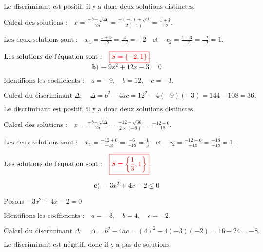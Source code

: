 \documentclass[12pt,a4paper]{article}
\begin{document}
\(
\text{Le discriminant est positif, il y a donc deux solutions distinctes.}
\)

\(
\text{Calcul des solutions :} \quad
x = \frac{-b \pm \sqrt{\Delta}}{2a} = \frac{-(-1) \pm \sqrt{9}}{2(-1)} = \frac{1 \pm 3}{-2}.
\)

\(
\text{Les deux solutions sont :} \quad
x_1 = \frac{1 + 3}{-2} = \frac{4}{-2} = -2 \quad \text{et} \quad x_2 = \frac{1 - 3}{-2} = \frac{-2}{-2} = 1.
\)

\(
\text{Les solutions de l'équation sont :} \quad
\textcolor{red}{\boxed{S=\left\lbrace  -2 , 1\right\rbrace  }}.
\)
\\
\[ \textbf{b)} \, -9x^2 + 12x - 3 = 0 \]

\(
\text{Identifions les coefficients :} \quad a = -9, \quad b = 12, \quad c = -3.
\)

\(
\text{Calcul du discriminant } \Delta : \quad
\Delta = b^2 - 4ac = 12^2 - 4(-9)(-3) = 144 - 108 = 36.
\)

\(
\text{Le discriminant est positif, il y a donc deux solutions distinctes.}
\)

\(
\text{Calcul des solutions :} \quad
x = \frac{-b \pm \sqrt{\Delta}}{2a} = \frac{-12 \pm \sqrt{36}}{2 \times (-9)} = \frac{-12 \pm 6}{-18}.
\)

\(
\text{Les deux solutions sont :} \quad
x_1 = \frac{-12 + 6}{-18} = \frac{-6}{-18} = \frac{1}{3} \quad \text{et} \quad
x_2 = \frac{-12 - 6}{-18} = \frac{-18}{-18} = 1.
\)

\(
\text{Les solutions de l'équation sont :} \quad
\textcolor{red}{\boxed{S=\left\lbrace \frac{1}{3} , 1 \right\rbrace}}.
\)

\[ \textbf{c)} \, -3x^2 + 4x - 2 \leq 0 \]

Posons \( -3x^2 + 4x - 2 = 0 \)

\(
\text{Identifions les coefficients :} \quad a = -3, \quad b = 4, \quad c = -2.
\)

\(
\text{Calcul du discriminant } \Delta : \quad
\Delta = b^2 - 4ac = (4)^2 - 4(-3)(-2) = 16 - 24  = -8.
\)

\(
\text{Le discriminant est négatif, donc il y a pas de solutions.}
\)

\end{document}
